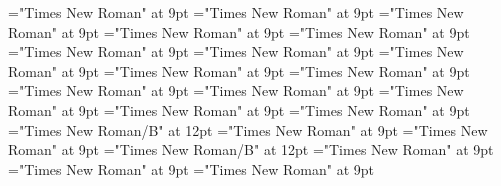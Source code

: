 \documentclass[gps1,twoside]{article}
\begin{document}
\font\usageusageusagessensesensessubentrysubentriesentrybefore="Times New Roman" at 9pt
\font\usagessensesensessubentrysubentriesentrybefore="Times New Roman" at 9pt
\font\usagessensesensessubentrysubentriesentryafter="Times New Roman" at 9pt
\font\abbreviationusageusagessensesensessubentrysubentriesentrybefore="Times New Roman" at 9pt
\font\visiblecomplexformbackrefvisiblecomplexformbackrefvisiblecomplexformbackrefssensesensessubentrysubentriesentrybefore="Times New Roman" at 9pt
\font\visiblecomplexformbackrefssensesensessubentrysubentriesentryafter="Times New Roman" at 9pt
\font\complexformtypesvisiblecomplexformbackrefvisiblecomplexformbackrefssensesensessubentrysubentriesentryafter="Times New Roman" at 9pt
\font\reverseabbrcomplexformtypecomplexformtypesvisiblecomplexformbackrefvisiblecomplexformbackrefssensesensessubentrysubentriesentrybefore="Times New Roman" at 9pt
\font\headwordvisiblecomplexformbackrefvisiblecomplexformbackrefssensesensessubentrysubentriesentrybefore="Times New Roman" at 9pt
\font\owningentrysummarydefinitionvisiblecomplexformbackrefvisiblecomplexformbackrefssensesensessubentrysubentriesentrybefore="Times New Roman" at 9pt
\font\spanowningentrysummarydefinitionvisiblecomplexformbackrefvisiblecomplexformbackrefssensesensessubentrysubentriesentryfirstchildbefore="Times New Roman" at 9pt
\font\spanowningentrysummarydefinitionvisiblecomplexformbackrefvisiblecomplexformbackrefssensesensessubentrysubentriesentrylastchildafter="Times New Roman" at 9pt
\font\nontrivialentryrootnontrivialentryrootnontrivialentryrootsvisiblecomplexformbackrefvisiblecomplexformbackrefssensesensessubentrysubentriesentrybefore="Times New Roman" at 9pt
\font\nontrivialentryrootsvisiblecomplexformbackrefvisiblecomplexformbackrefssensesensessubentrysubentriesentrybefore="Times New Roman" at 9pt
\font\nontrivialentryrootsvisiblecomplexformbackrefvisiblecomplexformbackrefssensesensessubentrysubentriesentryafter="Times New Roman" at 9pt
\font\nontrivialentryrootnontrivialentryrootsvisiblecomplexformbackrefvisiblecomplexformbackrefssensesensessubentrysubentriesentry="Times New Roman/B" at 12pt
\font\spansensecontentsensessensesensessubentrysubentriesentrybefore="Times New Roman" at 9pt
\font\sensessensesensessubentrysubentriesentryafter="Times New Roman" at 9pt
\font\sensenumbersensecontentsensessensesensessubentrysubentriesentry="Times New Roman/B" at 12pt
\font\sensenumbersensecontentsensessensesensessubentrysubentriesentryafter="Times New Roman" at 9pt
\font\sensetypesensesensessensesensessubentrysubentriesentrybefore="Times New Roman" at 9pt
\font\sensetypesensesensessensesensessubentrysubentriesentryafter="Times New Roman" at 9pt
\end{document}
